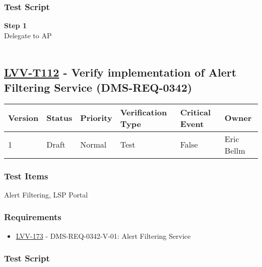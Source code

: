 \hypertarget{test-script-88}{%
\subsubsection{Test Script}\label{test-script-88}}

\textbf{Step 1}\\
Delegate to AP\\
~\\

\hypertarget{lvv-t112---verify-implementation-of-alert-filtering-service-dms-req-0342}{%
\subsection{\texorpdfstring{\href{https://jira.lsstcorp.org/secure/Tests.jspa\#/testCase/LVV-T112}{LVV-T112}
- Verify implementation of Alert Filtering Service
(DMS-REQ-0342)}{LVV-T112 - Verify implementation of Alert Filtering Service (DMS-REQ-0342)}}\label{lvv-t112---verify-implementation-of-alert-filtering-service-dms-req-0342}}

\begin{longtable}[]{@{}llllll@{}}
\toprule
Version & Status & Priority & Verification Type & Critical Event &
Owner\tabularnewline
\midrule
\endhead
1 & Draft & Normal & Test & False & Eric Bellm\tabularnewline
\bottomrule
\end{longtable}

\hypertarget{test-items-88}{%
\subsubsection{Test Items}\label{test-items-88}}

Alert Filtering, LSP Portal~

\hypertarget{requirements-89}{%
\subsubsection{Requirements}\label{requirements-89}}

\begin{itemize}
\tightlist
\item
  \href{https://jira.lsstcorp.org/browse/LVV-173}{LVV-173} -
  DMS-REQ-0342-V-01: Alert Filtering Service
\end{itemize}

\hypertarget{test-script-89}{%
\subsubsection{Test Script}\label{test-script-89}}

